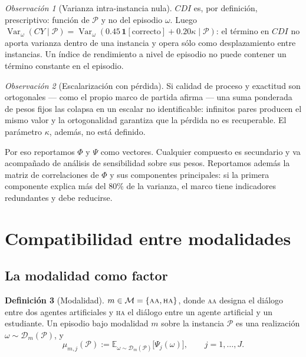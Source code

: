 \documentclass[11pt,a4paper]{article}
\theoremstyle{definition}
\newtheorem{definicion}{Definición}[section]
\theoremstyle{plain}
\theoremstyle{remark}
\newtheorem{observacion}[definicion]{Observación}
\DeclareMathOperator{\Var}{Var}
\newcommand{\ind}[1]{\mathbf{1}\!\left[#1\right]}
\newcommand{\Esp}{\mathbb{E}}
\newcommand{\modAA}{\textsc{aa}}
\newcommand{\modHA}{\textsc{ha}}
\begin{document}
\begin{observacion}[Varianza intra-instancia nula]
$CDI$ es, por definición, prescriptivo: función de $\mathcal{P}$ y no del episodio
$\omega$. Luego
$\Var_\omega(CY\mid\mathcal{P})=\Var_\omega(0.45\,\ind{\text{correcto}}+0.20\kappa\mid\mathcal{P})$:
el término en $CDI$ no aporta varianza dentro de una instancia y opera sólo como
desplazamiento entre instancias. Un índice de rendimiento a nivel de episodio no
puede contener un término constante en el episodio.
\end{observacion}

\begin{observacion}[Escalarización con pérdida]
Si calidad de proceso y exactitud son ortogonales --- como el propio marco de
partida afirma --- una suma ponderada de pesos fijos las colapsa en un escalar no
identificable: infinitos pares producen el mismo valor y la ortogonalidad
garantiza que la pérdida no es recuperable. El parámetro $\kappa$, además, no está
definido.
\end{observacion}

Por eso reportamos $\Phi$ y $\Psi$ como vectores. Cualquier compuesto es
secundario y va acompañado de análisis de sensibilidad sobre sus pesos. Reportamos
además la matriz de correlaciones de $\Phi$ y sus componentes principales: si la
primera componente explica más del $80\%$ de la varianza, el marco tiene
indicadores redundantes y debe reducirse.

\section{Compatibilidad entre modalidades}\label{sec:compat}

\subsection{La modalidad como factor}

\begin{definicion}[Modalidad]
$m\in\mathcal{M}=\{\modAA,\modHA\}$, donde \modAA{} designa el diálogo entre dos
agentes artificiales y \modHA{} el diálogo entre un agente artificial y un
estudiante. Un episodio bajo modalidad $m$ sobre la instancia $\mathcal{P}$ es una
realización $\omega\sim\mathcal{D}_m(\mathcal{P})$, y
\[
  \mu_{m,j}(\mathcal{P}):=\Esp_{\omega\sim\mathcal{D}_m(\mathcal{P})}\big[\Psi_j(\omega)\big],
  \qquad j=1,\dots,J.
\]
\end{definicion}
\end{document}
